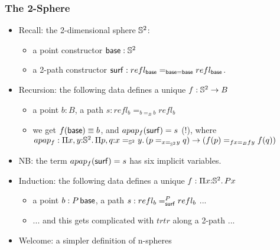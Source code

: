 \documentclass[handout]{beamer}
\newcommand{\depi}[3]{\Pi{#1{:}#2.\,#3}}
\begin{document}
\frame
  {
    \frametitle{The 2-Sphere}
    
\begin{itemize}    
    \item Recall: the 2-dimensional sphere $\mathbb{S}^2$:
\begin{itemize}
\item a point constructor $\mathsf{base} :\mathbb{S}^2$
\item a 2-path constructor $\mathsf{surf} : refl_{\mathsf{base}} =_{\mathsf{base}=\mathsf{base}} refl_{\mathsf{base}}$.
\end{itemize}
    \item Recursion: the following data defines a unique $f:\mathbb{S}^2 \to B$
\begin{itemize}
\item a point $b :B$, a path $s : refl_b=_{b=_B b} refl_b$
\item we get $f(\mathsf{base}) \equiv b$, and $apap_f(\mathsf{surf}) = s$ (!), where
$apap_f : \depi{x,y}{\Sn^2}{\depi{p,q}{x=_{\Sn^2} y}{(p=_{x=_{\Sn^2} y}q) \to {(f(p) =_{fx=_B fy} f(q))}}}$
\end{itemize}
    \item NB: the term $apap_f(\mathsf{surf}) = s$ has six implicit variables.
    \item Induction: the following data defines a unique $f:\depi{x}{\Sn^2}{Px}$
\begin{itemize}
\item a point $b :P\,\mathsf{base}$, a path $s : refl_b=^P_{\mathsf{surf}} refl_b$ ...
\item ... and this gets complicated with $trtr$ along a 2-path ...
\end{itemize}
    \item Welcome: a simpler definition of n-spheres  
 \end{itemize}
  }
 
\end{document}

